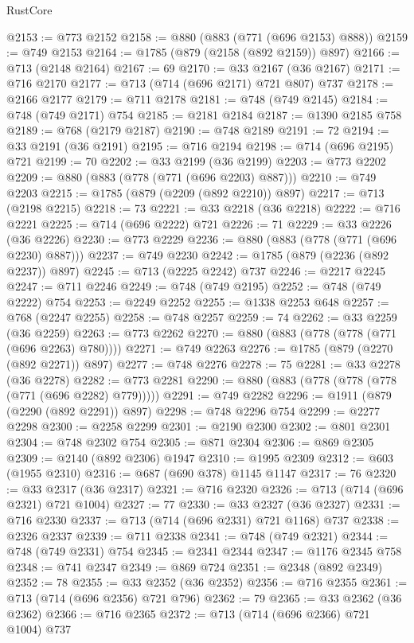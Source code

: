 \begin{lexlean}{RustCore}
\begin{coremodule}
@2153 := @773 @2152
@2158 := @880 (@883 (@771 (@696 @2153) @888))
@2159 := @749 @2153
@2164 := @1785 (@879 (@2158 (@892 @2159)) @897)
@2166 := @713 (@2148 @2164)
@2167 := 69
@2170 := @33 @2167 (@36 @2167)
@2171 := @716 @2170
@2177 := @713 (@714 (@696 @2171) @721 @807) @737
@2178 := @2166 @2177
@2179 := @711 @2178
@2181 := @748 (@749 @2145)
@2184 := @748 (@749 @2171) @754
@2185 := @2181 @2184
@2187 := @1390 @2185 @758
@2189 := @768 (@2179 @2187)
@2190 := @748 @2189
@2191 := 72
@2194 := @33 @2191 (@36 @2191)
@2195 := @716 @2194
@2198 := @714 (@696 @2195) @721
@2199 := 70
@2202 := @33 @2199 (@36 @2199)
@2203 := @773 @2202
@2209 := @880 (@883 (@778 (@771 (@696 @2203) @887)))
@2210 := @749 @2203
@2215 := @1785 (@879 (@2209 (@892 @2210)) @897)
@2217 := @713 (@2198 @2215)
@2218 := 73
@2221 := @33 @2218 (@36 @2218)
@2222 := @716 @2221
@2225 := @714 (@696 @2222) @721
@2226 := 71
@2229 := @33 @2226 (@36 @2226)
@2230 := @773 @2229
@2236 := @880 (@883 (@778 (@771 (@696 @2230) @887)))
@2237 := @749 @2230
@2242 := @1785 (@879 (@2236 (@892 @2237)) @897)
@2245 := @713 (@2225 @2242) @737
@2246 := @2217 @2245
@2247 := @711 @2246
@2249 := @748 (@749 @2195)
@2252 := @748 (@749 @2222) @754
@2253 := @2249 @2252
@2255 := @1338 @2253 @648
@2257 := @768 (@2247 @2255)
@2258 := @748 @2257
@2259 := 74
@2262 := @33 @2259 (@36 @2259)
@2263 := @773 @2262
@2270 := @880 (@883 (@778 (@778 (@771 (@696 @2263) @780))))
@2271 := @749 @2263
@2276 := @1785 (@879 (@2270 (@892 @2271)) @897)
@2277 := @748 @2276
@2278 := 75
@2281 := @33 @2278 (@36 @2278)
@2282 := @773 @2281
@2290 := @880 (@883 (@778 (@778 (@778 (@771 (@696 @2282) @779)))))
@2291 := @749 @2282
@2296 := @1911 (@879 (@2290 (@892 @2291)) @897)
@2298 := @748 @2296 @754
@2299 := @2277 @2298
@2300 := @2258 @2299
@2301 := @2190 @2300
@2302 := @801 @2301
@2304 := @748 @2302 @754
@2305 := @871 @2304
@2306 := @869 @2305
@2309 := @2140 (@892 @2306) @1947
@2310 := @1995 @2309
@2312 := @603 (@1955 @2310)
@2316 := @687 (@690 @378) @1145 @1147
@2317 := 76
@2320 := @33 @2317 (@36 @2317)
@2321 := @716 @2320
@2326 := @713 (@714 (@696 @2321) @721 @1004)
@2327 := 77
@2330 := @33 @2327 (@36 @2327)
@2331 := @716 @2330
@2337 := @713 (@714 (@696 @2331) @721 @1168) @737
@2338 := @2326 @2337
@2339 := @711 @2338
@2341 := @748 (@749 @2321)
@2344 := @748 (@749 @2331) @754
@2345 := @2341 @2344
@2347 := @1176 @2345 @758
@2348 := @741 @2347
@2349 := @869 @724
@2351 := @2348 (@892 @2349)
@2352 := 78
@2355 := @33 @2352 (@36 @2352)
@2356 := @716 @2355
@2361 := @713 (@714 (@696 @2356) @721 @796)
@2362 := 79
@2365 := @33 @2362 (@36 @2362)
@2366 := @716 @2365
@2372 := @713 (@714 (@696 @2366) @721 @1004) @737

\end{coremodule}
\end{lexlean}
